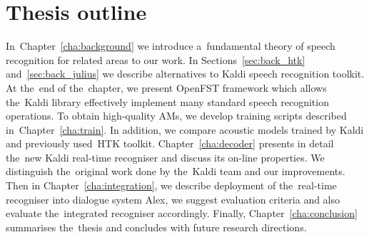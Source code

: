 \section*{Thesis outline} 
In~Chapter~\ref{cha:background} we introduce a~fundamental theory of speech recognition for related areas to our work.
In Sections~\ref{sec:back_htk} and~\ref{sec:back_julius} we describe alternatives to Kaldi speech recognition toolkit. 
At the~end of the~chapter, we present OpenFST framework which allows the~Kaldi library effectively implement many standard speech recognition operations. 
To obtain high-quality \aclp{AM}, we develop training scripts described in~Chapter~\ref{cha:train}. 
In addition, we compare acoustic models trained by Kaldi and previously used~\ac{HTK} toolkit. 
Chapter~\ref{cha:decoder} presents in detail the~new Kaldi real-time recogniser and discuss its on-line properties.
We distinguish the~original work done by the~Kaldi team and our improvements. 
Then in Chapter~\ref{cha:integration}, we describe deployment of the~real-time recogniser into dialogue system Alex, we suggest evaluation criteria and also evaluate the~integrated recogniser accordingly.
Finally, Chapter~\ref{cha:conclusion} summarises the~thesis and concludes with future research directions.

